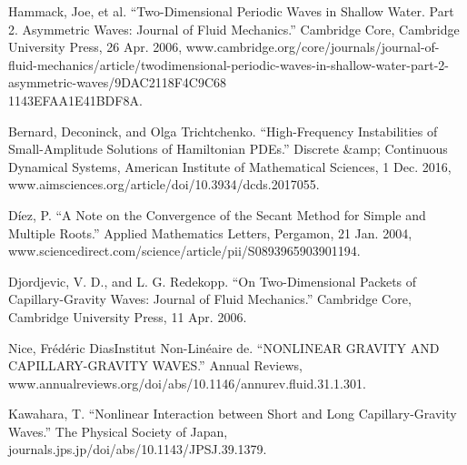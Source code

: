 \documentclass{article}
\begin{document}
\begin{enumerate}
{\item{Hammack, Joe, et al. “Two-Dimensional Periodic Waves in Shallow Water. Part 2. Asymmetric Waves: Journal of Fluid Mechanics.” Cambridge Core, Cambridge University Press, 26 Apr. 2006, www.cambridge.org/core/journals/journal-of-fluid-mechanics/article/twodimensional-periodic-waves-in-shallow-water-part-2-asymmetric-waves/9DAC2118F4C9C68\\1143EFAA1E41BDF8A.} \label{hammack} \\


\item{Bernard, Deconinck, and Olga Trichtchenko. “High-Frequency Instabilities of Small-Amplitude Solutions of Hamiltonian PDEs.” Discrete &amp; Continuous Dynamical Systems, American Institute of Mathematical Sciences, 1 Dec. 2016, www.aimsciences.org/article/doi/10.3934/dcds.2017055.} \label{bernardd} \\

\item{Díez, P. “A Note on the Convergence of the Secant Method for Simple and Multiple Roots.” Applied Mathematics Letters, Pergamon, 21 Jan. 2004, www.sciencedirect.com/science/article/pii/S0893965903901194.} \label{secant2} \\


\item{Djordjevic, V. D., and L. G. Redekopp. “On Two-Dimensional Packets of Capillary-Gravity Waves: Journal of Fluid Mechanics.” Cambridge Core, Cambridge University Press, 11 Apr. 2006.} \label{cap1} \\



\item{Nice, Frédéric DiasInstitut Non-Linéaire de. “NONLINEAR GRAVITY AND CAPILLARY-GRAVITY WAVES.” Annual Reviews, www.annualreviews.org/doi/abs/10.1146/annurev.fluid.31.1.301.} \label{cap3} \\

\item{Kawahara, T. “Nonlinear Interaction between Short and Long Capillary-Gravity Waves.” The Physical Society of Japan, journals.jps.jp/doi/abs/10.1143/JPSJ.39.1379.} \label{cap4} \\
}

\end{enumerate}
\end{document}
